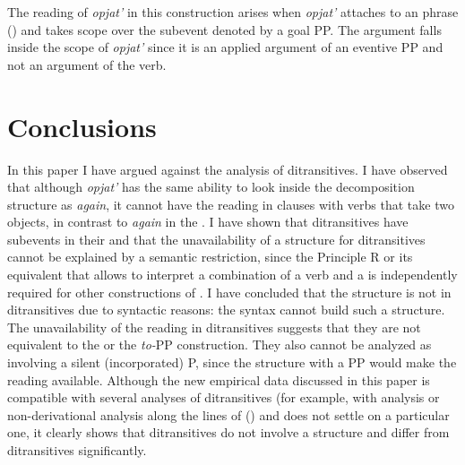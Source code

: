 \documentclass[output=paper]{langscibook}
\begin{document}
The  reading of \textit{opjat’} in this construction arises when \textit{opjat’} attaches to an  phrase () and takes scope over the  subevent denoted by a goal PP. The  argument falls inside the scope of \textit{opjat’} since it is an applied argument of an eventive PP and not an argument of the verb.


\section{Conclusions}\label{s6}

In this paper I have argued against the  analysis of  ditransitives. I have observed that although    \textit{opjat’} has the same ability to look inside the decomposition structure as  \textit{again}, it cannot have the  reading in clauses with  verbs that take two objects, in contrast to \textit{again} in the  . I have shown that  ditransitives have  subevents in their  and that the unavailability of a  structure for  ditransitives cannot be explained by a semantic restriction, since the Principle R or its equivalent that allows to interpret a combination of a verb and a  is independently required for other constructions of . I have concluded that the  structure is not  in  ditransitives due to syntactic reasons: the syntax cannot build such a structure. The unavailability of the  reading in  ditransitives suggests that they are not equivalent to the   or the \textit{to-}PP construction. They also cannot be analyzed as involving a silent (incorporated) P, since the structure with a PP would make the  reading available. Although the new empirical data discussed in this paper is compatible with several analyses of ditransitives (for example, with  analysis \citep{Bruening2010} or non-derivational analysis along the lines of (\citealt{Boneh-Nash2017}) and does not settle on a particular one, it clearly shows that  ditransitives do not involve a  structure and differ from  ditransitives significantly.\largerpage
\end{document}
